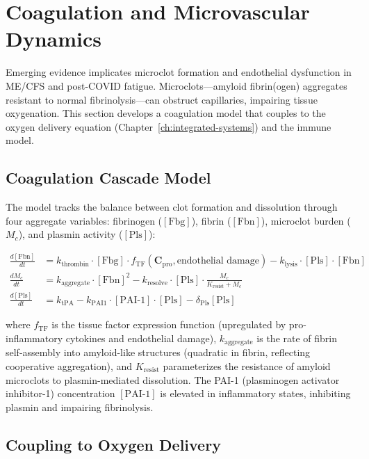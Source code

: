 \section{Coagulation and Microvascular Dynamics}
\label{sec:coagulation-model}

Emerging evidence implicates microclot formation and endothelial dysfunction in ME/CFS and post-COVID fatigue. Microclots---amyloid fibrin(ogen) aggregates resistant to normal fibrinolysis---can obstruct capillaries, impairing tissue oxygenation. This section develops a coagulation model that couples to the oxygen delivery equation (Chapter~\ref{ch:integrated-systems}) and the immune model.

\subsection{Coagulation Cascade Model}

The model tracks the balance between clot formation and dissolution through four aggregate variables: fibrinogen ($[\text{Fbg}]$), fibrin ($[\text{Fbn}]$), microclot burden ($M_c$), and plasmin activity ($[\text{Pls}]$):

\begin{align}
\label{eq:coagulation-dynamics}
\frac{d[\text{Fbn}]}{dt} &= k_{\text{thrombin}} \cdot [\text{Fbg}] \cdot f_{\text{TF}}(\boldsymbol{C}_{\text{pro}}, \text{endothelial damage}) - k_{\text{lysis}} \cdot [\text{Pls}] \cdot [\text{Fbn}] \\
\frac{dM_c}{dt} &= k_{\text{aggregate}} \cdot [\text{Fbn}]^2 - k_{\text{resolve}} \cdot [\text{Pls}] \cdot \frac{M_c}{K_{\text{resist}} + M_c} \\
\frac{d[\text{Pls}]}{dt} &= k_{\text{tPA}} - k_{\text{PAI1}} \cdot [\text{PAI-1}] \cdot [\text{Pls}] - \delta_{\text{Pls}} [\text{Pls}]
\end{align}

where $f_{\text{TF}}$ is the tissue factor expression function (upregulated by pro-inflammatory cytokines and endothelial damage), $k_{\text{aggregate}}$ is the rate of fibrin self-assembly into amyloid-like structures (quadratic in fibrin, reflecting cooperative aggregation), and $K_{\text{resist}}$ parameterizes the resistance of amyloid microclots to plasmin-mediated dissolution. The PAI-1 (plasminogen activator inhibitor-1) concentration $[\text{PAI-1}]$ is elevated in inflammatory states, inhibiting plasmin and impairing fibrinolysis.

\subsection{Coupling to Oxygen Delivery}

